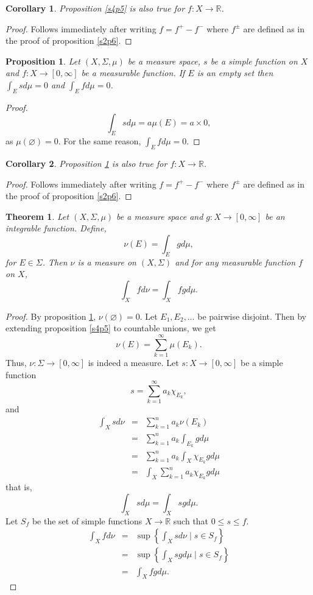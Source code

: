 \documentclass{article}
\newcommand{\sor}{\mathbb{R}}
\theoremstyle{plain}
\newtheorem{thm}{Theorem}
\numberwithin{thm}{section}
\theoremstyle{plain}
\newtheorem{prop}{Proposition}
\numberwithin{prop}{section}
\theoremstyle{definition}
\numberwithin{defn}{section}
\theoremstyle{remark}
\theoremstyle{plain}
\newtheorem{cor}{Corollary}
\numberwithin{cor}{section}
\numberwithin{equation}{section}
\begin{document}
\begin{cor}\label{s4c4}
Proposition \ref{s4p5} is also true for $f: X \rightarrow \sor$.
\end{cor}
\begin{proof}
Follows immediately after writing $f = f^+ - f^-$ where $f^{\pm}$ are defined as
in the proof of proposition \ref{s2p6}.
\end{proof}

\begin{prop}\label{s4p6}
Let $(X, \Sigma, \mu)$ be a measure space, $s$ be a simple function on $X$
and $f: X \rightarrow [0, \infty]$ be a measurable function. If $E$ is an empty
set then $\int_E sd\mu = 0$ and $\int_E fd\mu = 0$.
\end{prop}
\begin{proof}
\[
\int_E sd\mu = a\mu(E) = a \times 0,
\]
as $\mu(\varnothing) = 0$.
For the same reason, $\int_E fd\mu = 0$.
\end{proof}

\begin{cor}\label{s4c5}
Proposition \ref{s4p6} is also true for $f: X \rightarrow \sor$.
\end{cor}
\begin{proof}
Follows immediately after writing $f = f^+ - f^-$ where $f^{\pm}$ are defined as
in the proof of proposition \ref{s2p6}.
\end{proof}

\begin{thm}\label{s4t6}
Let $(X, \Sigma, \mu)$ be a measure space and $g: X \rightarrow [0, \infty]$ be an
integrable function. Define,
\[
\nu(E) = \int_E gd\mu,
\]
for $E \in \Sigma$. Then $\nu$ is a measure on $(X, \Sigma)$ and for any
measurable function $f$ on $X$,
\[
\int_X fd\nu = \int_X fgd\mu.
\]
\end{thm}
\begin{proof}
By proposition \ref{s4p6}, $\nu(\varnothing) = 0$. Let $E_1, E_2, \ldots$ be
pairwise disjoint. Then by extending proposition \ref{s4p5} to countable unions,
we get 
\[
\nu(E) = \sum_{k=1}^\infty \mu(E_k).
\]
Thus, $\nu: \Sigma \rightarrow [0, \infty]$ is indeed a measure. Let $s:X \rightarrow
[0, \infty]$ be a simple function
\[
s = \sum_{k=1}^\infty a_k\chi_{E_k},
\]
and
\begin{eqnarray*}
\int_X sd\nu &=& \sum_{k=1}^n a_k\nu(E_k) \\
 &=& \sum_{k=1}^n a_k\int_{E_k}gd\mu \\
 &=& \sum_{k=1}^n a_k\int_X \chi_{E_k}gd\mu \\
 &=& \int_X\sum_{k=1}^na_k\chi_{E_k}gd\mu
\end{eqnarray*}
that is,
\[
\int_X sd\mu = \int_X sgd\mu.
\]
Let $S_f$ be the set of simple functions $X \rightarrow \sor$ such that
$0 \le s \le f$. 
\begin{eqnarray*}
\int_X fd\nu &=& \sup\left\{\int_X s d\nu \;\Big|\; s \in S_f\right\} \\
 &=& \sup\left\{\int_X s gd\mu \;\Big|\; s \in S_f\right\} \\
 &=& \int_X fg d\mu.
\end{eqnarray*}
\end{proof}
\end{document}
